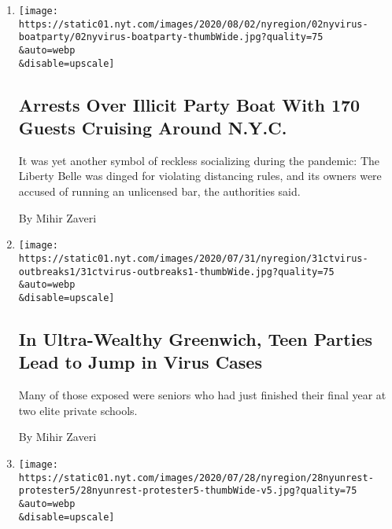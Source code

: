 \begin{enumerate}
\def\labelenumi{\arabic{enumi}.}
\item
  \href{/2020/08/02/nyregion/liberty-belle-illegal-party.html}{}

  \texttt{[image: https://static01.nyt.com/images/2020/08/02/nyregion/02nyvirus-boatparty/02nyvirus-boatparty-thumbWide.jpg?quality=75\\\&auto=webp\\\&disable=upscale]}

  \hypertarget{arrests-over-illicit-party-boat-with-170-guests-cruising-around-nyc}{%
  \subsection{Arrests Over Illicit Party Boat With 170 Guests Cruising
  Around
  N.Y.C.}\label{arrests-over-illicit-party-boat-with-170-guests-cruising-around-nyc}}

  It was yet another symbol of reckless socializing during the pandemic:
  The Liberty Belle was dinged for violating distancing rules, and its
  owners were accused of running an unlicensed bar, the authorities
  said.

  By Mihir Zaveri
\item
  \href{/2020/07/31/nyregion/greenwich-ct-coronavirus-covid-parties.html}{}

  \texttt{[image: https://static01.nyt.com/images/2020/07/31/nyregion/31ctvirus-outbreaks1/31ctvirus-outbreaks1-thumbWide.jpg?quality=75\\\&auto=webp\\\&disable=upscale]}

  \hypertarget{in-ultra-wealthy-greenwich-teen-parties-lead-to-jump-in-virus-cases}{%
  \subsection{In Ultra-Wealthy Greenwich, Teen Parties Lead to Jump in
  Virus
  Cases}\label{in-ultra-wealthy-greenwich-teen-parties-lead-to-jump-in-virus-cases}}

  Many of those exposed were seniors who had just finished their final
  year at two elite private schools.

  By Mihir Zaveri
\item
  \href{/2020/07/28/nyregion/nypd-protester-van.html}{}

  \texttt{[image: https://static01.nyt.com/images/2020/07/28/nyregion/28nyunrest-protester5/28nyunrest-protester5-thumbWide-v5.jpg?quality=75\\\&auto=webp\\\&disable=upscale]}

  \hypertarget{video-of-nypd-pulling-protester-into-unmarked-van-draws-criticism}{%
}
\end{enumerate}

